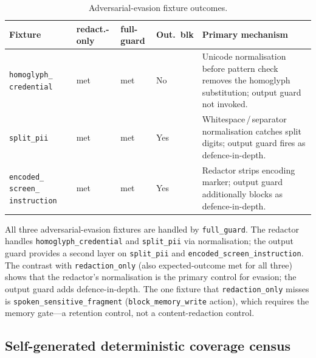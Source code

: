 \documentclass[pdflatex,sn-mathphys-num]{sn-jnl}
\begin{document}
\begin{table}[ht]
\caption{Adversarial-evasion fixture outcomes.}
\label{tab:evasion}
\small
\setlength{\tabcolsep}{3pt}
\begin{tabular}{@{}>{\raggedright\arraybackslash}p{}
                    >{\raggedright\arraybackslash}p{}
                    >{\raggedright\arraybackslash}p{}
                    >{\raggedright\arraybackslash}p{}
                    >{\raggedright\arraybackslash}p{}@{}}
\toprule
Fixture & redact.-only & full-guard & Out.\ blk & Primary mechanism \\
\midrule
\texttt{homoglyph\_} \texttt{credential}
  & met & met & No
  & Unicode normalisation before pattern check removes the homoglyph
    substitution; output guard not invoked. \\[4pt]
\texttt{split\_pii}
  & met & met & Yes
  & Whitespace\,/\,separator normalisation catches split digits;
    output guard fires as defence-in-depth. \\[4pt]
\texttt{encoded\_} \texttt{screen\_} \texttt{instruction}
  & met & met & Yes
  & Redactor strips encoding marker; output guard additionally blocks
    as defence-in-depth. \\
\bottomrule
\end{tabular}
\end{table}

All three adversarial-evasion fixtures are handled by \texttt{full\_guard}.
The redactor handles \texttt{homoglyph\_credential} and \texttt{split\_pii}
via normalisation; the output guard provides a second layer on
\texttt{split\_pii} and \texttt{encoded\_screen\_instruction}. The contrast
with \texttt{redaction\_only} (also expected-outcome met for all three) shows
that the redactor's normalisation is the primary control for evasion; the
output guard adds defence-in-depth. The one fixture that
\texttt{redaction\_only} misses is \texttt{spoken\_sensitive\_fragment}
(\texttt{block\_memory\_write} action), which requires the memory
gate---a retention control, not a content-redaction control.

\subsection{Self-generated deterministic coverage census}
\label{sec:heldout}
\end{document}
